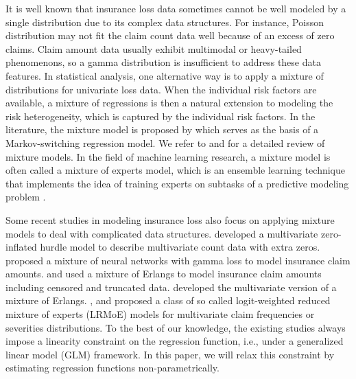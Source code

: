 \documentclass[11pt]{article}
\numberwithin{equation}{section}
\begin{document}
It is well known that insurance loss data sometimes cannot be well modeled by a single distribution due to its complex data structures. 
For instance, Poisson distribution may not fit the claim count data well because of an excess of zero claims.
Claim amount data usually exhibit multimodal or heavy-tailed phenomenons, so a gamma distribution is insufficient to address these data features.
In statistical analysis, one alternative way is to apply a mixture of distributions for univariate loss data.
When the individual risk factors are available, a mixture of regressions is then a natural extension to modeling the risk heterogeneity, which is captured by the individual risk factors.
In the literature,
the mixture model is proposed by \citet{goldfeld1973markov} which serves as the basis of a Markov-switching regression model.
We refer to \citet{lindsay1995mixture} and \citet{peel2000finite} for a detailed review of mixture models.
In the field of machine learning research, a mixture model is often called a mixture of experts model,
which is an ensemble learning technique that implements the idea of training experts on subtasks of a predictive modeling problem \citep{jacobs1991adaptive,jiang1999hierarchical}.

Some recent studies in modeling insurance loss also focus on applying mixture models to deal with complicated data structures.
\citet{zhang2020type, zhang2022new} developed a multivariate zero-inflated hurdle model to describe multivariate count data with extra zeros.
\citet{delong2021gamma} proposed a mixture of neural networks with gamma loss to model insurance claim amounts.
\citet{lee2010modeling} and \citet{verbelen2015fitting} used a mixture of Erlangs to model insurance claim amounts including censored and truncated data.
\citet{lee2012modeling} developed the multivariate version of a mixture of Erlangs.
\citet{fung2019class2}, \citet{fung2019class} and \citet{tseung2021lrmoe} proposed a class of so called logit-weighted reduced mixture of experts (LRMoE) models for multivariate claim frequencies or severities distributions.
To the best of our knowledge, the existing studies always impose a linearity constraint on the regression function, i.e., under a generalized linear model (GLM) framework.
In this paper, we will relax this constraint by estimating regression functions non-parametrically.
\end{document}
